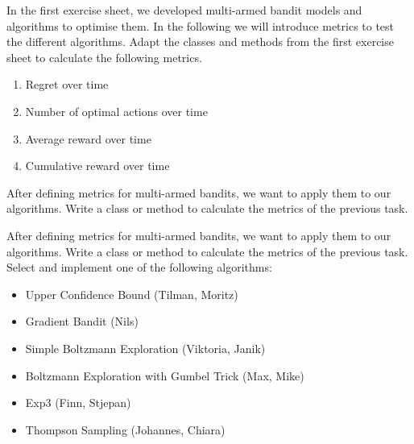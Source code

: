 \documentclass[a4paper,12pt]{report}
\begin{document}


In the first exercise sheet, we developed multi-armed bandit models and algorithms to optimise them. In the following we will introduce metrics to test the different algorithms. Adapt the classes and methods from the first exercise sheet to calculate the following metrics. 
\begin{enumerate}
	\item Regret over time
	\item Number of optimal actions over time
	\item Average reward over time
	\item Cumulative reward over time
\end{enumerate}

After defining metrics for multi-armed bandits, we want to apply them to our algorithms. Write a class or method to calculate the metrics of the previous task.


After defining metrics for multi-armed bandits, we want to apply them to our algorithms. Write a class or method to calculate the metrics of the previous task.
Select and implement one of the following algorithms:
\begin{itemize}
    \item Upper Confidence Bound (Tilman, Moritz)
    \item Gradient Bandit (Nils)
    \item Simple Boltzmann Exploration (Viktoria, Janik)
    \item Boltzmann Exploration with Gumbel Trick (Max, Mike)
    \item Exp3 (Finn, Stjepan)
    \item Thompson Sampling (Johannes, Chiara)
\end{itemize}
\end{document}
